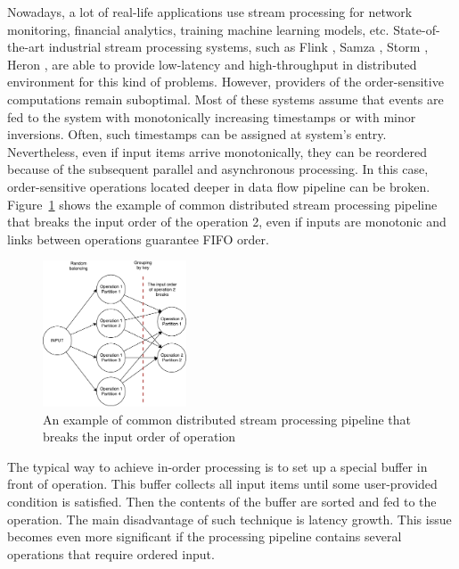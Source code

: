
\label {fs-intro}

Nowadays, a lot of real-life applications use stream processing for network monitoring, financial analytics, training machine learning models, etc. State-of-the-art industrial stream processing systems, such as Flink \cite{carbone2015apache}, Samza \cite{Noghabi:2017:SSS:3137765.3137770}, Storm \cite{apache:storm}, Heron \cite{Kulkarni:2015:THS:2723372.2742788}, are able to provide low-latency and high-throughput in distributed environment for this kind of problems. However, providers of the order-sensitive computations remain suboptimal. Most of these systems assume that events are fed to the system with monotonically increasing timestamps or with minor inversions. Often, such timestamps can be assigned at system's entry. Nevertheless, even if input items arrive monotonically, they can be reordered because of the subsequent parallel and asynchronous processing. In this case, order-sensitive operations located deeper in data flow pipeline can be broken. Figure~\ref{break-order-dataflow} shows the example of common distributed stream processing pipeline that breaks the input order of the operation 2, even if inputs are monotonic and links between operations guarantee FIFO order.

\begin{figure}[htbp]
  \centering
  \includegraphics[width=0.38\textwidth]{pics/break_order_pipeline}
  \caption{An  example of common distributed stream processing pipeline that breaks the input order of operation}
  \label {break-order-dataflow}
\end{figure}

The typical way to achieve in-order processing is to set up a special buffer in front of operation. This buffer collects all input items until some user-provided condition is satisfied. Then the contents of the buffer are sorted and fed to the operation. The main disadvantage of such technique is latency growth. This issue becomes even more significant if the processing pipeline contains several operations that require ordered input. 

